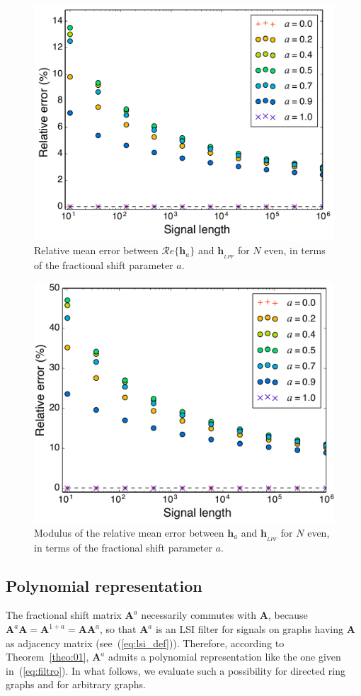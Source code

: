 \begin{figure}[ht!]
    \centering
    \includegraphics[width=0.5\linewidth]{Figures/convergence_even_N_real_part.pdf}
    \caption{Relative mean error between $ \mathcal{R}e\{\mathbf{h}_a\} $ and $ \mathbf{h}_{_{LPF}} $ for $ N $ even, in terms of the fractional shift parameter $a$.}
    \label{fig:convergence_even_N_real_part}
\end{figure}

\begin{figure}[ht!]
    \centering
    \includegraphics[width=0.5\linewidth]{Figures/convergence_even_N_abs_V2.pdf}
    \caption{Modulus of the relative mean error between $ \mathbf{h}_a $ and $ \mathbf{h}_{_{LPF}} $ for $ N $ even, in terms of the fractional shift parameter $a$.}
    \label{fig:convergence_even_N_abs}
    \vspace{-0.3cm}
\end{figure}

\subsection{Polynomial representation}\label{subsec:poly}
The fractional shift matrix $ \mathbf{A}^a$ necessarily commutes with $ \mathbf{A} $, because $ \mathbf{A}^a\mathbf{A} = \mathbf{A}^{1 + a} = \mathbf{A}\mathbf{A}^a  $, so that $ \mathbf{A}^a $ is an LSI filter for signals on graphs having  $ \mathbf{A} $ as adjacency matrix (see~(\ref{eq:lsi_def})). Therefore, according to Theorem~\ref{theo:01}, $\mathbf{A}^a$ admits a polynomial representation like the one given in~(\ref{eq:filtro}). In what follows, we evaluate such a possibility for directed ring graphs and for arbitrary graphs.

